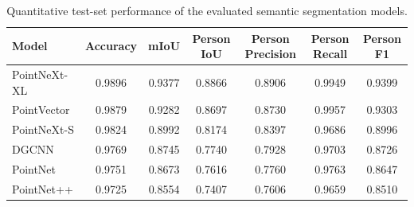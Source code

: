 \begin{table}[ht]
\centering
\caption{Quantitative test-set performance of the evaluated semantic segmentation models.}
\label{tab:test-results}
\begin{tabular}{lcccccc}
\hline
Model & Accuracy & mIoU & Person IoU & Person Precision & Person Recall & Person F1 \\
\hline
PointNeXt-XL & 0.9896 & 0.9377 & 0.8866 & 0.8906 & 0.9949 & 0.9399 \\
PointVector & 0.9879 & 0.9282 & 0.8697 & 0.8730 & 0.9957 & 0.9303 \\
PointNeXt-S & 0.9824 & 0.8992 & 0.8174 & 0.8397 & 0.9686 & 0.8996 \\
DGCNN & 0.9769 & 0.8745 & 0.7740 & 0.7928 & 0.9703 & 0.8726 \\
PointNet & 0.9751 & 0.8673 & 0.7616 & 0.7760 & 0.9763 & 0.8647 \\
PointNet++ & 0.9725 & 0.8554 & 0.7407 & 0.7606 & 0.9659 & 0.8510 \\
\hline
\end{tabular}
\end{table}